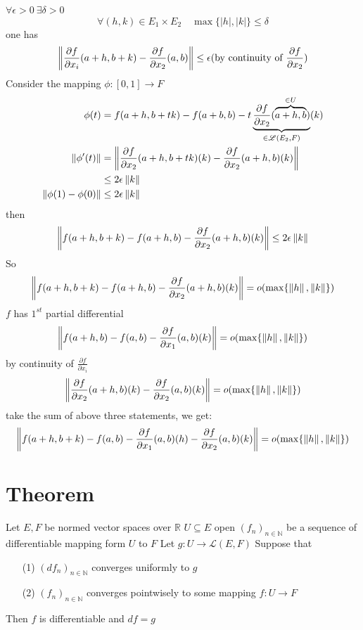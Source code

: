 \documentclass{book}
\newcommand{\abs}[1]{\left\lvert #1 \right\rvert}
\begin{document}
$\forall \epsilon>0\ \exists \delta>0$$$\forall(h,k)\in E_1\times E_2\quad \max\{\abs{h},\abs{k}\}\leq\delta$$
one has 
$$\left\lVert \frac{\partial f}{\partial x_i}(a+h,b+k)-\frac{\partial f}{\partial x_2}(a,b) \right\rVert\leq\epsilon (\text{by continuity of }\frac{\partial f}{\partial x_2})$$
Consider the mapping $\phi:[0,1]\rightarrow F$
$$$$
$$$$
$$$$
$$\begin{aligned}
    \phi(t) &= f(a+h,b+tk)-f(a+b,b)-t\underbrace{\frac{\partial f}{\partial x_2}(\overbrace{a+h,b}\limits^{\in U})}\limits_{\in \mathscr{L}(E_2,F)}(k)\\
    \left\lVert \phi'(t) \right\rVert &= \left\lVert \frac{\partial f}{\partial x_2}(a+h,b+tk)(k)-\frac{\partial f}{\partial x_2}(a+h,b)(k) \right\rVert\\
    &\leq 2\epsilon\left\lVert k \right\rVert\\
    \left\lVert \phi(1)-\phi(0) \right\rVert &\leq 2\epsilon\left\lVert k \right\rVert       
\end{aligned}$$
then $$\left\lVert f(a+h,b+k)-f(a+h,b)-\frac{\partial f}{\partial x_2}(a+h,b)(k) \right\rVert \leq 2\epsilon\left\lVert k \right\rVert $$
So $$\left\lVert f(a+h,b+k)-f(a+h,b)-\frac{\partial f}{\partial x_2}(a+h,b)(k) \right\rVert = o(\max\{\left\lVert h \right\rVert,\left\lVert k \right\rVert\})$$
$f$ has $1^{st}$ partial differential
$$\left\lVert f(a+h,b)-f(a,b)-\frac{\partial f}{\partial x_1}(a,b)(k) \right\rVert = o(\max\{\left\lVert h \right\rVert,\left\lVert k \right\rVert\})$$
by continuity of $\frac{\partial f}{\partial x_i}$
$$\left\lVert \frac{\partial f}{\partial x_2}(a+h,b)(k)-\frac{\partial f}{\partial x_2}(a,b)(k) \right\rVert = o(\max\{\left\lVert h \right\rVert,\left\lVert k \right\rVert\})$$
take the sum of above three statements, we get:
$$\left\lVert f(a+h,b+k)-f(a,b)-\frac{\partial f}{\partial x_1}(a,b)(h)-\frac{\partial f}{\partial x_2}(a,b)(k) \right\rVert=o(\max\{\left\lVert h \right\rVert,\left\lVert k \right\rVert\})$$
\section{Theorem}
Let $E,F$ be normed vector spaces over $\mathbb{R}$ $U\subseteq E$ open $(f_n)_{n\in \mathbb{N}}$ be a sequence of differentiable mapping form $U$ to $F$ Let $g:U\rightarrow \mathscr{L}(E,F)$ Suppose that \begin{itemize}
    \item [(1)]$(df_n)_{n\in \mathbb{N}}$ converges uniformly to $g$
    \item [(2)]$(f_n)_{n\in \mathbb{N}}$ converges pointwisely to some  mapping $f:U\rightarrow F$
\end{itemize}
Then $f$ is differentiable and $df=g$
\end{document}
